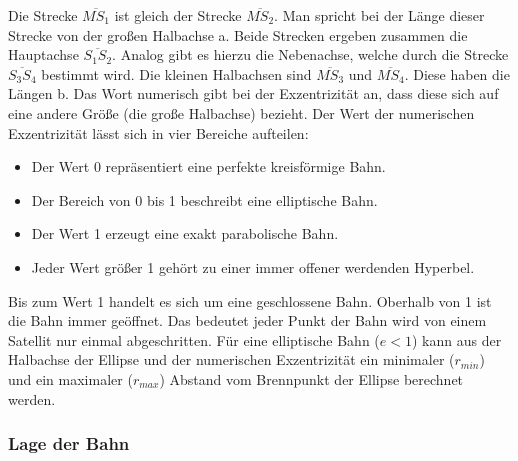 Die Strecke \ensuremath{\overline{MS_{1}}} ist gleich der Strecke \ensuremath{\overline{MS_{2}}}. Man spricht bei der Länge dieser Strecke von der großen Halbachse a. Beide Strecken ergeben zusammen die Hauptachse \ensuremath{\overline{S_{1}S_{2}}}. Analog gibt es hierzu die Nebenachse, welche durch die Strecke \ensuremath{\overline{S_{3}S_{4}}} bestimmt wird. Die kleinen Halbachsen sind \ensuremath{\overline{MS_{3}}} und \ensuremath{\overline{MS_{4}}}. Diese haben die Längen b.  Das Wort numerisch gibt bei der Exzentrizität an, dass diese sich auf eine andere Größe (die große Halbachse) bezieht. Der Wert der numerischen Exzentrizität lässt sich in vier Bereiche aufteilen: 
\begin{itemize}
	\item Der Wert 0 repräsentiert eine perfekte kreisförmige Bahn.
	\item Der Bereich von 0 bis 1 beschreibt eine elliptische Bahn.
	\item Der Wert 1 erzeugt eine exakt parabolische Bahn.
	\item Jeder Wert größer 1 gehört zu einer immer offener werdenden Hyperbel.  
\end{itemize}   

Bis zum Wert 1 handelt es sich um eine geschlossene Bahn. Oberhalb von 1 ist die Bahn immer geöffnet. Das bedeutet jeder Punkt der Bahn wird von einem Satellit nur einmal abgeschritten. Für eine elliptische Bahn (\ensuremath{e < 1}) kann aus der Halbachse der Ellipse und der numerischen Exzentrizität ein minimaler (\ensuremath{r_{min}}) und ein maximaler (\ensuremath{r_{max}}) Abstand vom Brennpunkt der Ellipse berechnet werden.     

\subsubsection*{Lage der Bahn}


